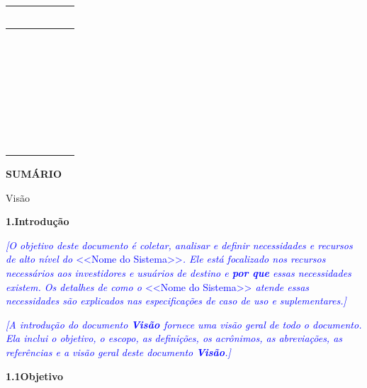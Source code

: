 \documentclass[a4paper]{article}
\begin{document}
\begin{flushleft}
\begin{supertabular}{|m{1.4108598in}|m{0.70045984in}|m{2.3323598in}|m{1.5115598in}|}
~
\\\hline
~

~

~

~
 &
~

~

~

~
 &
~

~

~

~
 &
~

~

~

~
\\\hline
\end{supertabular}
\end{flushleft}

\bigskip

\textbf{SUM\'ARIO}

\setcounter{tocdepth}{10}
\renewcommand\contentsname{}
\tableofcontents

\bigskip


\bigskip


\bigskip

{\centering
Vis\~ao
\par}

\hypertarget{5w8r46f16jr3}{}\textbf{1.Introdu\c{c}\~ao}

\textit{\textcolor{blue}{[O objetivo deste documento \'e coletar, analisar e definir necessidades e recursos de alto
n\'ivel do }}\textcolor{blue}{{\textless}{\textless}Nome do
Sistema{\textgreater}{\textgreater}}\textit{\textcolor{blue}{. Ele est\'a focalizado nos recursos necess\'arios aos
investidores e usu\'arios de destino e }}\textbf{\textit{\textcolor{blue}{por que}}}\textit{\textcolor{blue}{ essas
necessidades existem. Os detalhes de como o }}\textcolor{blue}{{\textless}{\textless}Nome do
Sistema{\textgreater}{\textgreater}}\textit{\textcolor{blue}{ atende essas necessidades s\~ao explicados nas
especifica\c{c}\~oes de caso de uso e suplementares.]}}

\textit{\textcolor{blue}{[A introdu\c{c}\~ao do documento }}\textbf{\textit{\textcolor{blue}{Vis\~ao
}}}\textit{\textcolor{blue}{fornece uma vis\~ao geral de todo o documento. Ela inclui o objetivo, o escopo, as
defini\c{c}\~oes, os acr\^onimos, as abrevia\c{c}\~oes, as refer\^encias e a vis\~ao geral deste documento
}}\textbf{\textit{\textcolor{blue}{Vis\~ao}}}\textit{\textcolor{blue}{.]}}

\hypertarget{srl4xio0egtt}{}\textbf{1.1Objetivo}
\end{document}
